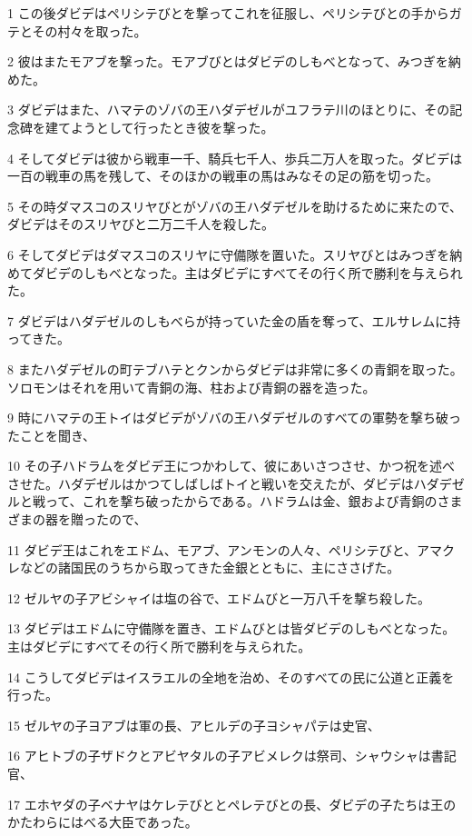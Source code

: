 \par 1 この後ダビデはペリシテびとを撃ってこれを征服し、ペリシテびとの手からガテとその村々を取った。
\par 2 彼はまたモアブを撃った。モアブびとはダビデのしもべとなって、みつぎを納めた。
\par 3 ダビデはまた、ハマテのゾバの王ハダデゼルがユフラテ川のほとりに、その記念碑を建てようとして行ったとき彼を撃った。
\par 4 そしてダビデは彼から戦車一千、騎兵七千人、歩兵二万人を取った。ダビデは一百の戦車の馬を残して、そのほかの戦車の馬はみなその足の筋を切った。
\par 5 その時ダマスコのスリヤびとがゾバの王ハダデゼルを助けるために来たので、ダビデはそのスリヤびと二万二千人を殺した。
\par 6 そしてダビデはダマスコのスリヤに守備隊を置いた。スリヤびとはみつぎを納めてダビデのしもべとなった。主はダビデにすべてその行く所で勝利を与えられた。
\par 7 ダビデはハダデゼルのしもべらが持っていた金の盾を奪って、エルサレムに持ってきた。
\par 8 またハダデゼルの町テブハテとクンからダビデは非常に多くの青銅を取った。ソロモンはそれを用いて青銅の海、柱および青銅の器を造った。
\par 9 時にハマテの王トイはダビデがゾバの王ハダデゼルのすべての軍勢を撃ち破ったことを聞き、
\par 10 その子ハドラムをダビデ王につかわして、彼にあいさつさせ、かつ祝を述べさせた。ハダデゼルはかつてしばしばトイと戦いを交えたが、ダビデはハダデゼルと戦って、これを撃ち破ったからである。ハドラムは金、銀および青銅のさまざまの器を贈ったので、
\par 11 ダビデ王はこれをエドム、モアブ、アンモンの人々、ペリシテびと、アマクレなどの諸国民のうちから取ってきた金銀とともに、主にささげた。
\par 12 ゼルヤの子アビシャイは塩の谷で、エドムびと一万八千を撃ち殺した。
\par 13 ダビデはエドムに守備隊を置き、エドムびとは皆ダビデのしもべとなった。主はダビデにすべてその行く所で勝利を与えられた。
\par 14 こうしてダビデはイスラエルの全地を治め、そのすべての民に公道と正義を行った。
\par 15 ゼルヤの子ヨアブは軍の長、アヒルデの子ヨシャパテは史官、
\par 16 アヒトブの子ザドクとアビヤタルの子アビメレクは祭司、シャウシャは書記官、
\par 17 エホヤダの子ベナヤはケレテびととペレテびとの長、ダビデの子たちは王のかたわらにはべる大臣であった。

